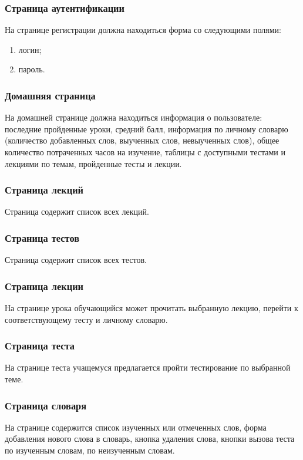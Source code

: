 \documentclass[a4paper,14pt]{extarticle}
\begin{document}
\subsubsection{Страница аутентификации}
На странице регистрации должна находиться форма со следующими полями:
\begin{enumerate}
    \item логин;
    \item пароль.
\end{enumerate}

\subsubsection{Домашняя страница}
На домашней странице должна находиться информация о пользователе: последние пройденные уроки,
средний балл, информация по личному словарю (количество добавленных слов, выученных слов, невыученных слов),
общее количество потраченных часов на изучение, таблицы с доступными тестами и лекциями по темам,
пройденные тесты и лекции. 

\subsubsection{Страница лекций}
Страница содержит список всех лекций.

\subsubsection{Страница тестов}
Страница содержит список всех тестов.

\subsubsection{Страница лекции}
На странице урока обучающийся может прочитать выбранную лекцию, перейти к соответствующему тесту и личному словарю.

\subsubsection{Страница теста}
На странице теста учащемуся предлагается пройти тестирование по выбранной теме.

\subsubsection{Страница словаря}
На странице содержится список изученных или отмеченных слов, форма добавления нового слова в словарь,
кнопка удаления слова, кнопки вызова теста по изученным словам, по неизученным словам.
\end{document}
